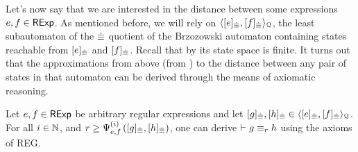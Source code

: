 %
%    
 Let's now say that we are interested in the distance between some expressions $e,f \in \mathsf{RExp}$. As mentioned before, we will rely on $\langle [e]_{{\mathrel{\dot\equiv}}},[f]_{{\mathrel{\dot\equiv}}} \rangle_{\mathcal{Q}}$, the least subautomaton of the ${\mathrel{\dot\equiv}}$ quotient of the Brzozowski automaton containing states reachable from $[e]_{{\mathrel{\dot\equiv}}}$ and $[f]_{{\mathrel{\dot\equiv}}}$. Recall that by  its state space is finite. It turns out that the approximations from above (from ) to the distance between any pair of states in that automaton can be derived through the means of axiomatic reasoning.
\begin{lemma}\label{c2:lem:provability1}
	Let $e,f \in \mathsf{RExp}$ be arbitrary regular expressions and let $[g]_{{\mathrel{\dot\equiv}}}, [h]_{{\mathrel{\dot\equiv}}} \in \langle [e]_{{\mathrel{\dot\equiv}}},[f]_{{\mathrel{\dot\equiv}}} \rangle_{\mathcal{Q}}$. 
       For all $i \in \mathbb{N}$, and $r \geq {\Psi}_{e,f}^{(i)}\left([g]_{{\mathrel{\dot\equiv}}}, [h]_{{\mathrel{\dot\equiv}}}\right)$, one can derive $\vdash g \equiv_{r} h$ using the axioms of \textsf{REG}.
\end{lemma}
